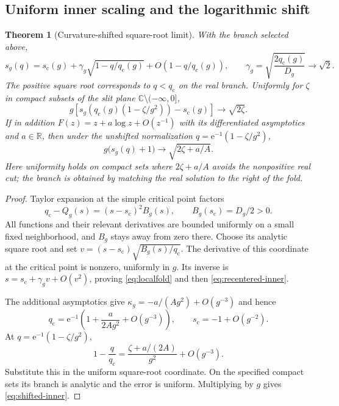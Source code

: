 \documentclass[11pt,a4paper]{article}
\numberwithin{equation}{section}
\newtheorem{theorem}{Theorem}[section]
\theoremstyle{definition}
\theoremstyle{remark}
\newcommand{\C}{\mathbb C}
\newcommand{\R}{\mathbb R}
\newcommand{\e}{\mathrm e}
\begin{document}
\subsection{Uniform inner scaling and the logarithmic shift}
\begin{theorem}[Curvature-shifted square-root limit]
\label{thm:inner}
With the branch selected above,
\begin{equation}
 s_g(q)=s_{\mathrm c}(g)+
 \gamma_g\sqrt{1-q/q_{\mathrm c}(g)}
 +O(1-q/q_{\mathrm c}(g)),
 \qquad \gamma_g=\sqrt{\frac{2q_{\mathrm c}(g)}{D_g}}\longrightarrow\sqrt2.
 \label{eq:localfold}
\end{equation}
The positive square root corresponds to $q<q_{\mathrm c}$ on the real branch. Uniformly for $\zeta$ in compact subsets of the slit plane $\C\setminus(-\infty,0]$,
\begin{equation}
 g\left[s_g\left(q_{\mathrm c}(g)(1-\zeta/g^2)\right)-s_{\mathrm c}(g)\right]
 \longrightarrow\sqrt{2\zeta}.
 \label{eq:recentered-inner}
\end{equation}
If in addition
$F(z)=z+a\log z+O(z^{-1})$ with its differentiated asymptotics and $a\in\R$, then under the unshifted normalization
$q=\e^{-1}(1-\zeta/g^2)$,
\begin{equation}
 g\big(s_g(q)+1\big)\longrightarrow\sqrt{2\zeta+a/A}.
 \label{eq:shifted-inner}
\end{equation}
Here uniformity holds on compact sets where $2\zeta+a/A$ avoids the nonpositive real cut; the branch is obtained by matching the real solution to the right of the fold.
\end{theorem}
\begin{proof}
Taylor expansion at the simple critical point factors
\[
 q_{\mathrm c}-Q_g(s)=(s-s_{\mathrm c})^2B_g(s),
 \qquad B_g(s_{\mathrm c})=D_g/2>0.
\]
All functions and their relevant derivatives are bounded uniformly on a small fixed neighborhood, and $B_g$ stays away from zero there. Choose its analytic square root and set
$v=(s-s_{\mathrm c})\sqrt{B_g(s)/q_{\mathrm c}}$. The derivative of this coordinate at the critical point is nonzero, uniformly in $g$. Its inverse is
$s=s_{\mathrm c}+\gamma_gv+O(v^2)$, proving \eqref{eq:localfold} and then \eqref{eq:recentered-inner}.

The additional asymptotics give
$\kappa_g=-a/(Ag^2)+O(g^{-3})$ and hence
\[
 q_{\mathrm c}=\e^{-1}\left(1+\frac{a}{2Ag^2}+O(g^{-3})\right),
 \qquad s_{\mathrm c}=-1+O(g^{-2}).
\]
At $q=\e^{-1}(1-\zeta/g^2)$,
\[
 1-\frac q{q_{\mathrm c}}=
 \frac{\zeta+a/(2A)}{g^2}+O(g^{-3}).
\]
Substitute this in the uniform square-root coordinate. On the specified compact sets its branch is analytic and the error is uniform. Multiplying by $g$ gives \eqref{eq:shifted-inner}.
\end{proof}
\end{document}
